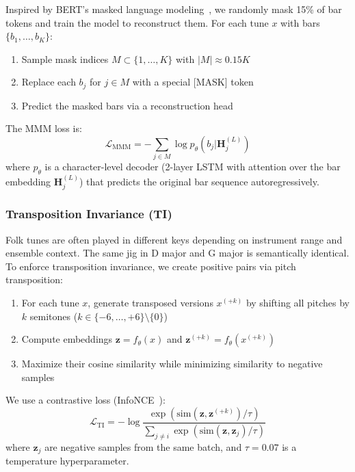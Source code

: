 \documentclass[]{interact}
\theoremstyle{plain}
\theoremstyle{definition}
\theoremstyle{remark}
\begin{document}
Inspired by BERT's masked language modeling~\cite{BERT2019}, we randomly mask 15\% of bar tokens and train the model to reconstruct them. For each tune $x$ with bars $\{b_1, \ldots, b_K\}$:
\begin{enumerate}
\item Sample mask indices $M \subset \{1, \ldots, K\}$ with $|M| \approx 0.15K$
\item Replace each $b_j$ for $j \in M$ with a special [MASK] token
\item Predict the masked bars via a reconstruction head
\end{enumerate}

The MMM loss is:
\begin{equation}
\mathcal{L}_{\text{MMM}} = -\sum_{j \in M} \log p_\theta(b_j | \mathbf{H}^{(L)}_j)
\end{equation}
where $p_\theta$ is a character-level decoder (2-layer LSTM with attention over the bar embedding $\mathbf{H}^{(L)}_j$) that predicts the original bar sequence autoregressively.

\subsubsection{Transposition Invariance (TI)}

Folk tunes are often played in different keys depending on instrument range and ensemble context. The same jig in D major and G major is semantically identical. To enforce transposition invariance, we create positive pairs via pitch transposition:
\begin{enumerate}
\item For each tune $x$, generate transposed versions $x^{(+k)}$ by shifting all pitches by $k$ semitones ($k \in \{-6, \ldots, +6\} \setminus \{0\}$)
\item Compute embeddings $\mathbf{z} = f_\theta(x)$ and $\mathbf{z}^{(+k)} = f_\theta(x^{(+k)})$
\item Maximize their cosine similarity while minimizing similarity to negative samples
\end{enumerate}

We use a contrastive loss (InfoNCE~\cite{SimCLR2020}):
\begin{equation}
\mathcal{L}_{\text{TI}} = -\log \frac{\exp(\text{sim}(\mathbf{z}, \mathbf{z}^{(+k)}) / \tau)}{\sum_{j \neq i} \exp(\text{sim}(\mathbf{z}, \mathbf{z}_j) / \tau)}
\end{equation}
where $\mathbf{z}_j$ are negative samples from the same batch, and $\tau = 0.07$ is a temperature hyperparameter.
\end{document}

